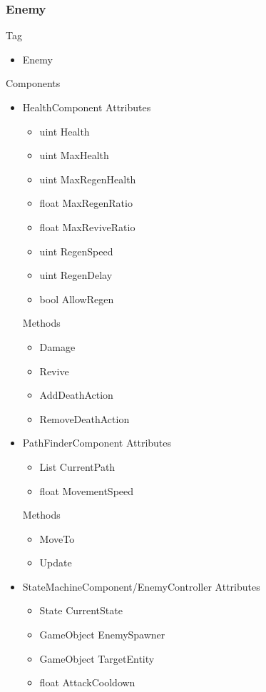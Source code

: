 \documentclass[11pt]{article}
\begin{document}
\subsubsection{Enemy}
Tag
\begin{itemize}
	\item Enemy
\end{itemize}
Components
\begin{itemize}
	\item HealthComponent
	\newline Attributes
	\begin{itemize}
		\item uint Health
		\item uint MaxHealth
		\item uint MaxRegenHealth
		\item float MaxRegenRatio
		\item float MaxReviveRatio
		\item uint RegenSpeed
		\item uint RegenDelay
		\item bool AllowRegen
	\end{itemize}
	Methods
	\begin{itemize}
		\item Damage
		\item Revive
		\item AddDeathAction
		\item RemoveDeathAction
	\end{itemize}
	\item PathFinderComponent
	\newline Attributes
	\begin{itemize}
		\item List CurrentPath
		\item float MovementSpeed
	\end{itemize}
	Methods
	\begin{itemize}
		\item MoveTo
		\item Update
	\end{itemize}
	\item StateMachineComponent/EnemyController
	\newline Attributes
	\begin{itemize}
		\item State CurrentState
		\item GameObject EnemySpawner
		\item GameObject TargetEntity
		\item float AttackCooldown

\end{itemize}
\end{itemize}
\end{document}

